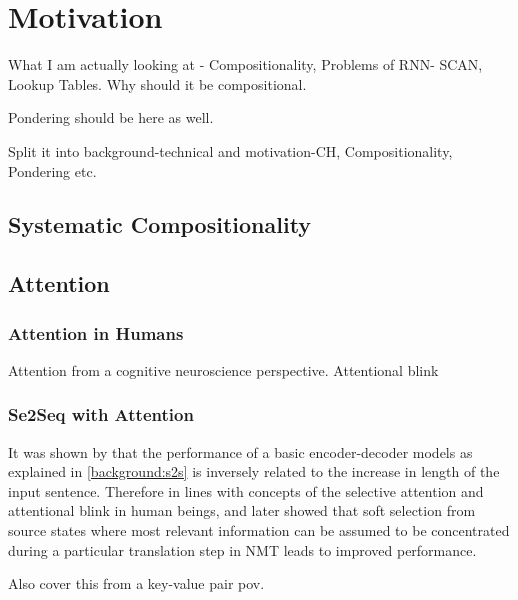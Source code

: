 \chapter{Motivation} \label{Chapter:motivation}

What I am actually looking at -  Compositionality, Problems of RNN- SCAN, Lookup Tables. Why should it be compositional.

Pondering should be here as well.

Split it into background-technical and motivation-CH, Compositionality, Pondering etc.

\section{Systematic Compositionality} \label{systematic}

\section{Attention}

\subsection{Attention in Humans}
Attention from a cognitive neuroscience perspective. Attentional blink

\subsection{Se2Seq with Attention}
It was shown by \cite{Cho2014} that the performance of a basic encoder-decoder models as explained in \ref{background:s2s} is inversely related to the increase in length of the input sentence. Therefore in lines with concepts of the selective attention and attentional blink in human beings, \cite{Bahdanau2014} and later  \cite{Luong2015} showed that soft selection from source states where most relevant information can be assumed to be concentrated during a particular translation step in NMT leads to improved performance.

Also cover this from a key-value pair pov.


